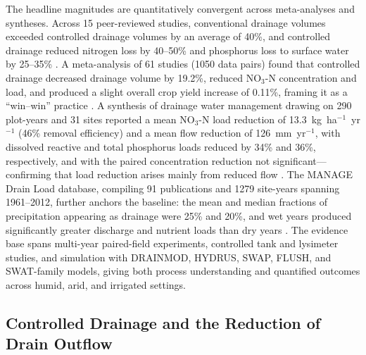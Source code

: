 \documentclass[11pt]{article}
\begin{document}
The headline magnitudes are quantitatively convergent across meta-analyses and
syntheses. Across 15 peer-reviewed studies, conventional drainage volumes
exceeded controlled drainage volumes by an average of 40\%, and controlled
drainage reduced nitrogen loss by 40--50\% and phosphorus loss to surface water
by 25--35\% \parencite{Strock2011}. A meta-analysis of 61 studies (1050 data
pairs) found that controlled drainage decreased drainage volume by 19.2\%,
reduced NO$_3$-N concentration and load, and produced a slight overall crop
yield increase of 0.11\%, framing it as a ``win--win'' practice
\parencite{Wang2020c}. A synthesis of drainage water management drawing on 290
plot-years and 31 sites reported a mean NO$_3$-N load reduction of
13.3~kg~ha$^{-1}$~yr$^{-1}$ (46\% removal efficiency) and a mean flow reduction
of 126~mm~yr$^{-1}$, with dissolved reactive and total phosphorus loads reduced
by 34\% and 36\%, respectively, and with the paired concentration reduction not
significant---confirming that load reduction arises mainly from reduced flow
\parencite{Frankenberger2024}. The MANAGE Drain Load database, compiling 91
publications and 1279 site-years spanning 1961--2012, further anchors the
baseline: the mean and median fractions of precipitation appearing as drainage
were 25\% and 20\%, and wet years produced significantly greater discharge and
nutrient loads than dry years \parencite{Christianson2015}. The evidence base
spans multi-year paired-field experiments, controlled tank and lysimeter
studies, and simulation with DRAINMOD, HYDRUS, SWAP, FLUSH, and SWAT-family
models, giving both process understanding and quantified outcomes across humid,
arid, and irrigated settings.

\subsection{Controlled Drainage and the Reduction of Drain Outflow}
\end{document}
